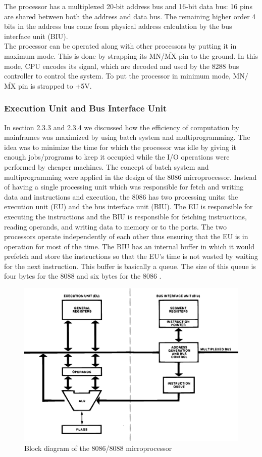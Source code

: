 The processor has a multiplexed 20-bit address bus and 16-bit data bus: 16 pins are shared between both the address and data bus. The remaining higher order 4 bits in the address bus come from physical address calculation by the bus interface unit (BIU).\\
The processor can be operated along with other processors by putting it in maximum mode. This is done by strapping its MN/$\overline{\text{MX}}$ pin to the ground. In this mode, CPU encodes its signal, which are decoded and used by the 8288 bus controller to control the system. To put the processor in minimum mode, MN/$\overline{\text{MX}}$ pin is strapped to +5V.

\subsubsection{Execution Unit and Bus Interface Unit}
In section 2.3.3 and 2.3.4 we discussed how the efficiency of computation by mainframes was maximized by using batch system and multiprogramming. The idea was to minimize the time for which the processor was idle by giving it enough jobs/programs to keep it occupied while the I/O operations were performed by cheaper machines. The concept of batch system and multiprogramming were applied in the design of the 8086 microprocessor. Instead of having a single processing unit which was responsible for fetch and writing data and instructions and execution, the 8086 has two processing units: the execution unit (EU) and the bus interface unit (BIU). The EU is responsible for executing the instructions and the BIU is responsible for fetching instructions, reading operands, and writing data to memory or to the ports. The two processors operate independently of each other thus ensuring that the EU is in operation for most of the time. The BIU has an internal buffer in which it would prefetch and store the instructions so that the EU's time is not wasted by waiting for the next instruction. This buffer is basically a queue. The size of this queue is four bytes for the 8088 and six bytes for the 8086 \cite{intel19908086}.
\begin{figure}[h]
  \centering
  \includegraphics[scale=0.25]{figures/8086block.eps}
  \caption{Block diagram of the 8086/8088 microprocessor \cite{intel1979the}}
\label{fig:8086block}
\end{figure}

